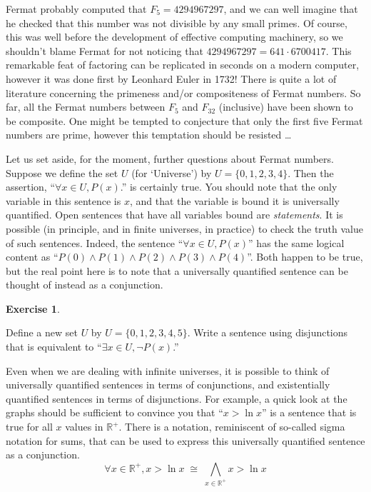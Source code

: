 \documentclass[10pt,]{book}
\theoremstyle{plain}
\theoremstyle{definition}
\theoremstyle{definition}
\newtheorem{exercise}[theorem]{Exercise}
\numberwithin{equation}{section}
\begin{document}
    Fermat probably computed that \(F_5=4294967297\), and we can well imagine
    that he checked that this number was not divisible by any small primes.
    Of course, this was well before the development of effective computing
    machinery, so we shouldn't blame Fermat for not noticing that
    \(4294967297 = 641 \cdot 6700417\). This remarkable feat of factoring
    can be replicated in seconds on a modern computer, however it was done
    first by  Leonhard Euler in 1732!
    There is quite a lot of literature
    concerning the primeness and/or compositeness of Fermat numbers. So
    far, all the Fermat numbers between \(F_5\) and \(F_{32}\) (inclusive) have
    been shown to be composite. One might be tempted to conjecture that
    only the first five Fermat numbers are prime, however this temptation
    should be resisted \dots{}
\par

    Let us set aside, for the moment, further questions about Fermat numbers.
    Suppose we define the set \(U\) (for `Universe') by \(U=\{0,1,2,3,4\}\).
    Then the assertion, ``\(\forall x \in U, P(x)\).'' is certainly true.
    You should note that the only variable in this sentence is \(x\), and
    that the variable is bound \textemdash{} it is universally quantified. Open sentences
    that have all variables bound are \emph{statements}. It is possible
    (in principle, and in finite universes, in practice) to check the
    truth value of such sentences.
    Indeed, the sentence ``\(\forall x \in U, P(x)\)'' has the same logical content
    as ``\(P(0) \land P(1) \land P(2) \land P(3)  \land P(4)\)''. Both happen to be
    true, but the real point here is to note that a universally quantified sentence
    can be thought of instead as a conjunction.
\begin{exercise}\label{exercise-13}

        Define a new set \(U\) by \(U=\{0,1,2,3,4,5\}\).
        Write a sentence using disjunctions
        that is equivalent to ``\(\exists x \in U, {\lnot}P(x)\).''
\end{exercise}
\par

    Even when we are dealing with infinite universes, it is possible to
    think of universally quantified sentences in terms of conjunctions,
    and existentially quantified sentences in terms of disjunctions. For
    example, a quick look at the graphs should be sufficient to convince you
    that ``\(x > \ln x\)'' is a sentence that is true for all \(x\) values in
    \({\mathbb R}^+\). There is a notation, reminiscent of so-called sigma notation
    for sums, that can be used to express this universally quantified sentence as
    a conjunction.
    \begin{equation*}
      \forall x \in {\mathbb R}^+, x > \ln x \; \cong \; 
      \bigwedge_{x \in {\mathbb R}^+} x > \ln x
    \end{equation*}
\par
\end{document}
